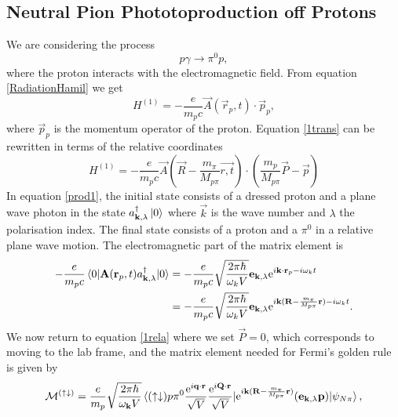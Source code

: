 \subsection{Neutral Pion Phototoproduction off Protons}\label{sec:NeutralOffProton}
We are considering the process 
\begin{equation} \label{prod1}
	p\gamma \rightarrow \pi^0 p,
\end{equation}
where the proton interacts with the electromagnetic field. From equation \eqref{RadiationHamil} we get
\begin{equation} \label{1trans}
	H^{(1)} = -\frac{e}{m_pc} \vec{A}(\vec{r}_p,t)\cdot \vec{p}_p,
\end{equation}
where $\vec{p}_p$ is the momentum operator of the proton.  Equation \eqref{1trans} can be rewritten in terms of the relative coordinates
\begin{equation} \label{1rela}
	H^{(1)} = -\frac{e}{m_p c}\vec{A}\left( \vec{R}-\frac{m_\pi}{M_{p\pi}}\vec{r,t}\right) \cdot \left( \frac{m_p}{M_{p\pi}}\vec{P}-\vec{p}\right)
\end{equation}
In equation \eqref{prod1}, the initial state consists of a dressed proton and a plane wave photon in the state $a_{\bm{\mathrm{k}},\lambda}^\dagger\ket{0}$ where $\vec{k}$ is the wave number and $\lambda$ the polarisation index. The final state consists of a proton and a $\pi^0$ in a relative plane wave motion. The electromagnetic part of the matrix element is
\begin{align} \label{eletrans}
	-\frac{e}{m_p c}\mel{0}{\bm{\mathrm{A}}(\bm{\mathrm{r}}_p,t)a^\dagger_{\bm{\mathrm{k}},\lambda}}{0} &= -\frac{e}{m_p c}\sqrt{\frac{2\pi\hbar}{\omega_k V}}\bm{\mathrm{e}}_{\bm{\mathrm{k}},\lambda} \text{e}^{i\bm{\mathrm{k}}\cdot \bm{\mathrm{r}}_p-i\omega_k t} \\
	&=  -\frac{e}{m_p c}\sqrt{\frac{2\pi\hbar}{\omega_k V}}\bm{\mathrm{e}}_{\bm{\mathrm{k}},\lambda} \text{e}^{i\bm{\mathrm{k}}( \bm{\mathrm{R}}-\frac{m_\pi}{M_{p\pi}}\bm{\mathrm{r}})-i\omega_k t}.
\end{align}
We now return to equation \ref{1rela} where we set $\vec{P}=0$, which corresponds to moving to the lab frame, and the matrix element needed for Fermi's golden rule is given by
\begin{equation}\label{MatrixSpinupdown} 
	\mathcal{M}^{(\uparrow\downarrow)} = \frac{e}{m_p} \sqrt{\frac{2\pi\hbar}{\omega_{\bm{\mathrm{k}}}V}} \mel*{(\uparrow\downarrow)p\pi^0 \frac{\text{e}^{i\bm{\mathrm{q}}\cdot \bm{\mathrm{r}}}}{\sqrt{V}}\frac{\text{e}^{i\bm{\mathrm{Q}}\cdot \bm{\mathrm{r}}}}{\sqrt{V}}}{\text{e}^{i\bm{\mathrm{k}}(\bm{\mathrm{R}}-\frac{m_\pi}{M_{p\pi}}\bm{\mathrm{r}})}(\bm{\mathrm{e}}_{\bm{\mathrm{k}},\lambda}\bm{\mathrm{p}})}{\psi_{N\pi}} ,
\end{equation}
